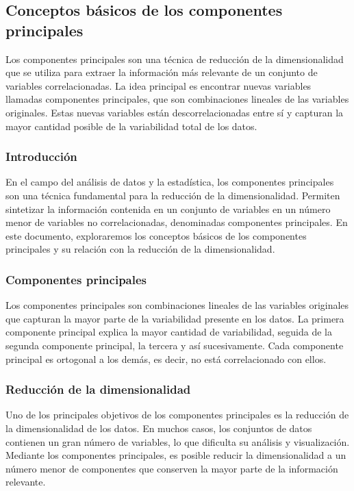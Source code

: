 \documentclass{article}
\begin{document}
\subsection{Conceptos básicos de los componentes principales}
Los componentes principales son una técnica de reducción de la dimensionalidad que se utiliza para extraer la información más relevante de un conjunto de variables correlacionadas. La idea principal es encontrar nuevas variables llamadas componentes principales, que son combinaciones lineales de las variables originales. Estas nuevas variables están descorrelacionadas entre sí y capturan la mayor cantidad posible de la variabilidad total de los datos.


\subsubsection{Introducción}
En el campo del análisis de datos y la estadística, los componentes principales son una técnica fundamental para la reducción de la dimensionalidad. Permiten sintetizar la información contenida en un conjunto de variables en un número menor de variables no correlacionadas, denominadas componentes principales. En este documento, exploraremos los conceptos básicos de los componentes principales y su relación con la reducción de la dimensionalidad.

\subsubsection{Componentes principales}
Los componentes principales son combinaciones lineales de las variables originales que capturan la mayor parte de la variabilidad presente en los datos. La primera componente principal explica la mayor cantidad de variabilidad, seguida de la segunda componente principal, la tercera y así sucesivamente. Cada componente principal es ortogonal a los demás, es decir, no está correlacionado con ellos.

\subsubsection{Reducción de la dimensionalidad}
Uno de los principales objetivos de los componentes principales es la reducción de la dimensionalidad de los datos. En muchos casos, los conjuntos de datos contienen un gran número de variables, lo que dificulta su análisis y visualización. Mediante los componentes principales, es posible reducir la dimensionalidad a un número menor de componentes que conserven la mayor parte de la información relevante.
\end{document}
